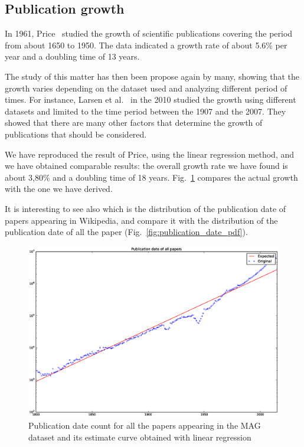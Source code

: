
\subsection{Publication growth}
In 1961, Price~\cite{Price1961} studied the growth of scientific publications covering the period from about 1650 to 1950.
The data indicated a growth rate of about 5.6\% per year and a doubling time of 13 years.

The study of this matter has then been propose again by many, showing that the growth varies depending on the dataset used and analyzing different period of times.
For instance, Larsen et al.~\cite{Larsen2010} in the 2010 studied the growth using different datasets and limited to the time period between the 1907 and the 2007.
They showed that there are many other factors that determine the growth of publications that should be considered.

We have reproduced the result of Price, using the linear regression method, and we have obtained comparable results: the overall growth rate we have found is about 3,80\% and a doubling time of 18 years.
Fig.~\ref{fig:publication_date_regression} compares the actual growth with the one we have derived.

It is interesting to see also which is the distribution of the publication date of papers appearing in Wikipedia, and compare it with the distribution of the publication date of all the paper (Fig.~\ref{fig:publication_date_pdf}).


\begin{figure}[h]
\centering
\includegraphics[keepaspectratio=true, width=\textwidth]{assets/publication_date_regression}
\caption{Publication date count for all the papers appearing in the \ac{MAG} dataset and its estimate curve obtained with linear regression}
\label{fig:publication_date_regression}
\end{figure}


